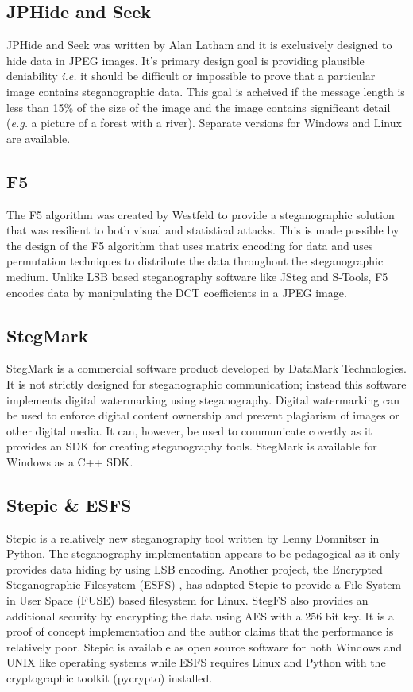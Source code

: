 \documentclass[12pt]{extreport}
\begin{document}
\subsection{JPHide and Seek}
JPHide and Seek \cite{jphide} was written by Alan Latham and it is exclusively designed to hide data in JPEG images. It's primary design goal is providing plausible deniability \emph{i.e.} it should be difficult or impossible to prove that a particular image contains steganographic data. This goal is acheived if the message length is less than 15\% of the size of the image and the image contains significant detail (\emph{e.g.} a picture of a forest with a river). Separate versions for Windows and Linux are available.
 \subsection{F5}
 The F5 algorithm \cite{westfeld2001f5} was created by Westfeld to provide a steganographic solution that was resilient to both visual and statistical attacks. This is made possible by the design of the F5 algorithm that uses matrix encoding for data and uses permutation techniques to distribute the data throughout the steganographic medium. Unlike LSB based steganography software like JSteg and S-Tools, F5 encodes data by manipulating the DCT coefficients in a JPEG image. 
 \subsection{StegMark}
 StegMark \cite{stegmark} is a commercial software product developed by DataMark Technologies. It is not strictly designed for steganographic communication; instead this software implements digital watermarking using steganography. Digital watermarking can be used to enforce digital content ownership and prevent plagiarism of images or other digital media. It can, however, be used to communicate covertly as it provides an SDK for creating steganography tools. StegMark is available for Windows as a C++ SDK.
 \subsection{Stepic \& ESFS}
 Stepic \cite{stepnic} is a relatively new steganography tool written by Lenny Domnitser in Python. The steganography implementation appears to be pedagogical as it only provides data hiding by using LSB encoding. Another project, the Encrypted Steganographic Filesystem (ESFS) \cite{esfs}, has adapted Stepic to provide a File System in User Space (FUSE) based filesystem for Linux. StegFS also provides an additional security by encrypting the data using AES with a 256 bit key. It is a proof of concept implementation and the author claims that the performance is relatively poor. Stepic is available as open source software for both Windows and UNIX like operating systems while ESFS requires Linux and Python with the cryptographic toolkit (pycrypto) installed.
\end{document}
